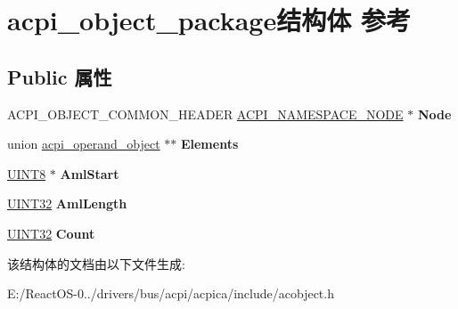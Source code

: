 \hypertarget{structacpi__object__package}{}\section{acpi\+\_\+object\+\_\+package结构体 参考}
\label{structacpi__object__package}
\subsection*{Public 属性}
\begin{DoxyCompactItemize}
\item 
\mbox{\label{structacpi__object__package_a2137899276ad54857d42db4363de7b35}} 
A\+C\+P\+I\+\_\+\+O\+B\+J\+E\+C\+T\+\_\+\+C\+O\+M\+M\+O\+N\+\_\+\+H\+E\+A\+D\+ER \hyperlink{structacpi__namespace__node}{A\+C\+P\+I\+\_\+\+N\+A\+M\+E\+S\+P\+A\+C\+E\+\_\+\+N\+O\+DE} $\ast$ {\bfseries Node}
\item 
\mbox{\label{structacpi__object__package_ad712ac027151181e91202610bd0807f2}} 
union \hyperlink{unionacpi__operand__object}{acpi\+\_\+operand\+\_\+object} $\ast$$\ast$ {\bfseries Elements}
\item 
\mbox{\label{structacpi__object__package_a1c5fa88421e0b1384977e0c0e412ca18}} 
\hyperlink{_processor_bind_8h_ab27e9918b538ce9d8ca692479b375b6a}{U\+I\+N\+T8} $\ast$ {\bfseries Aml\+Start}
\item 
\mbox{\label{structacpi__object__package_a62e2c367cfd94c022fdee8cd9292fce6}} 
\hyperlink{_processor_bind_8h_ae1e6edbbc26d6fbc71a90190d0266018}{U\+I\+N\+T32} {\bfseries Aml\+Length}
\item 
\mbox{\label{structacpi__object__package_aa0d7611d40887bdeaa4cfd3424c0f43a}} 
\hyperlink{_processor_bind_8h_ae1e6edbbc26d6fbc71a90190d0266018}{U\+I\+N\+T32} {\bfseries Count}
\end{DoxyCompactItemize}


该结构体的文档由以下文件生成\+:\begin{DoxyCompactItemize}
\item 
E\+:/\+React\+O\+S-\/0../drivers/bus/acpi/acpica/include/acobject.\+h\end{DoxyCompactItemize}
